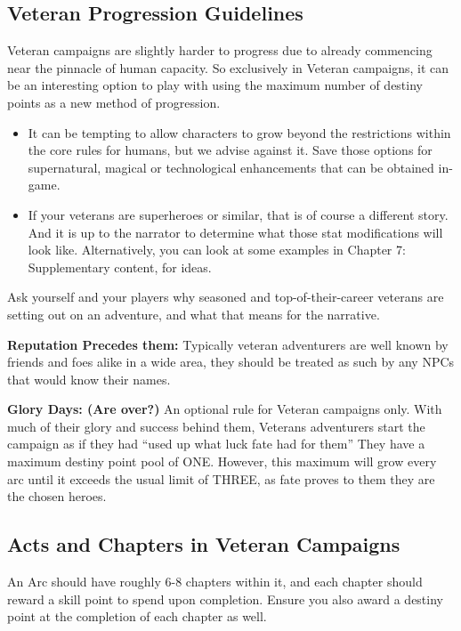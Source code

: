 \subsection{Veteran Progression Guidelines}

Veteran campaigns are slightly harder to progress due to already commencing near the pinnacle of human capacity. So exclusively in Veteran campaigns, it can be an interesting option to play with using the maximum number of destiny points as a new method of progression.

\begin{itemize}
    \item It can be tempting to allow characters to grow beyond the restrictions within the core rules for humans, but we advise against it. Save those options for supernatural, magical or technological enhancements that can be obtained in-game.
    \item If your veterans are superheroes or similar, that is of course a different story. And it is up to the narrator to determine what those stat modifications will look like. Alternatively, you can look at some examples in Chapter 7: Supplementary content, for ideas.
\end{itemize}

Ask yourself and your players why seasoned and top-of-their-career veterans are setting out on an adventure, and what that means for the narrative.

\textbf{Reputation Precedes them:} Typically veteran adventurers are well known by friends and foes alike in a wide area, they should be treated as such by any NPCs that would know their names.

\textbf{Glory Days: (Are over?)} An optional rule for Veteran campaigns only. With much of their glory and success behind them, Veterans adventurers start the campaign as if they had “used up what luck fate had for them” They have a maximum destiny point pool of ONE. However, this maximum will grow every arc until it exceeds the usual limit of THREE, as fate proves to them they are the chosen heroes.

\subsection{Acts and Chapters in Veteran Campaigns}

An Arc should have roughly 6-8 chapters within it, and each chapter should reward a skill point to spend upon completion. Ensure you also award a destiny point at the completion of each chapter as well.

